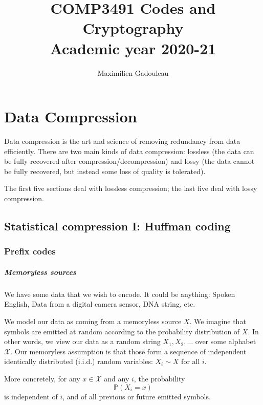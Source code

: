 \documentclass[a4paper, 11pt, openany]{book}
\title{COMP3491 Codes and Cryptography\\ Academic year 2020-21}
\date{\Important{Version \today}}
\author{Maximilien Gadouleau}
\numberwithin{equation}{section}
\theoremstyle{plain}
\theoremstyle{definition}
\newcommand{\probability}{\mathbb{P}}
\begin{document}
\maketitle

\tableofcontents


\chapter{Data Compression}

Data compression is the art and science of removing redundancy from data efficiently. There are two main kinds of data compression: lossless (the data can be fully recovered after compression/decompression) and lossy (the data cannot be fully recovered, but instead some loss of quality is tolerated).

The first five sections deal with lossless compression; the last five deal with lossy compression.

\section{Statistical compression I: Huffman coding}
\label{sec:01}

\subsection{Prefix codes}

\paragraph{Memoryless sources}

We have some data that we wish to encode. It could be anything: Spoken English, Data from a digital camera sensor, DNA string, etc.

We model our data as coming from a memoryless source $X$. We imagine that symbols are emitted at random according to the probability distribution of $X$. In other words, we view our data as a random string $X_1, X_2, \dots$ over some alphabet $\mathcal{X}$. Our memoryless assumption is that those form a sequence of independent identically distributed (i.i.d.) random variables: $X_i \sim X$ for all $i$.

More concretely, for any $x \in \mathcal{X}$ and any $i$, the probability 
\[
    \probability(X_i = x)
\]
is independent of $i$, and of all previous or future emitted symbols.
\end{document}
